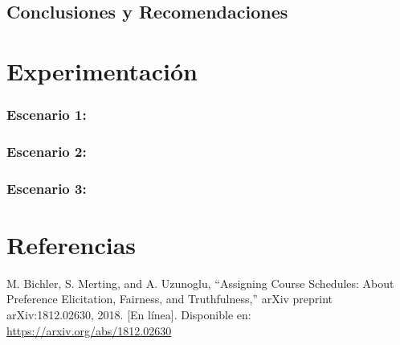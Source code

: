 \documentclass{article}
\begin{document}
\subsection{Conclusiones y Recomendaciones}



\section{Experimentación}\label{sec:exp}

\subsubsection{Escenario 1: }

\subsubsection{Escenario 2: }

\subsubsection{Escenario 3: }


\section{Referencias}
\renewcommand{\refname}{}

\begin{thebibliography}{9}

   \label{ref:BPS} M. Bichler, S. Merting, and A. Uzunoglu,
  “Assigning Course Schedules: About Preference Elicitation, Fairness, and Truthfulness,”
  arXiv preprint arXiv:1812.02630, 2018. [En línea]. Disponible en:
  \url{https://arxiv.org/abs/1812.02630}


\end{thebibliography}
\end{document}
